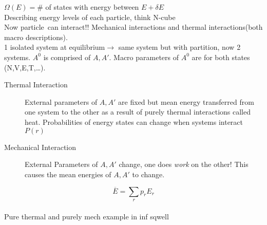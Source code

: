 \documentclass{article}
\def \pa {particle\ }
\begin{document}
\begin{lecture}
    $\Omega(E)=\#$ of states with energy between $E+\delta E$
    \\
    Describing energy levels of each particle, think N-cube
    \\
    Now \pa can interact!! Mechanical interactions and thermal interactions(both macro descriptions). 
    \\
    1 isolated system at equilibrium$\rightarrow$ same system but with partition, now 2 systems. $A^0$ is comprised of $A,A'$. Macro parameters of $A^0$ are for both states (N,V,E,T,\ldots).
    \\
    \begin{description}
        \item [Thermal Interaction] External parameters of $A,A'$ are fixed but mean energy transferred from one system to the other as a result of purely thermal interactions called heat. Probabilities of energy states can change when systems interact $P(r)$
        \item [Mechanical Interaction] External Parameters of $A,A'$ change, one does \emph{work} on the other! This causes the mean energies of $A,A'$ to change. 
    \end{description}
    $$\overline{E}=\sum_rp_rE_r$$
    \\
    Pure thermal and purely mech example in inf sqwell
\end{lecture}
\end{document}
